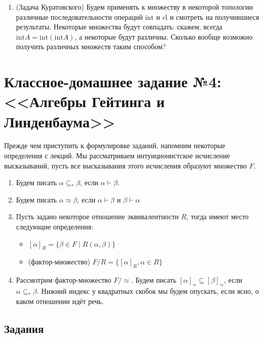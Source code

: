 \documentclass[10pt,a4paper,oneside]{article}
\begin{document}
\begin{enumerate}
\item (Задача Куратовского) Будем применять к множеству в некоторой топологии различные 
последовательности операций $\mathrm{int}$ и $\mathrm{cl}$ и смотреть на получившиеся
результаты. Некоторые множества будут
совпадать: скажем, всегда $\mathrm{int}A = \mathrm{int}(\mathrm{int}A)$, а некоторые будут
различны. Сколько вообще возможно получить различных множеств таким способом?

\end{enumerate}

\section*{Классное-домашнее задание №4: <<Алгебры Гейтинга и Линденбаума>>}

Прежде чем приступить к формулировке заданий, напомним некоторые определения с лекций.
Мы рассматриваем интуиционистское исчисление высказываний, пусть все высказывания этого 
исчисления образуют множество $F$.

\begin{enumerate}
\item Будем писать $\alpha\subseteq_*\beta$, если $\alpha\vdash\beta$.
\item Будем писать $\alpha\approx\beta$, если $\alpha\vdash\beta$ и $\beta\vdash\alpha$
\item Пусть задано некоторое отношение эквивалентности $R$, тогда имеют место следующие определения:
\begin{itemize}
\item $[\alpha]_R = \{\beta\in F \mid R(\alpha,\beta) \}$
\item (фактор-множество) $F/R = \{[\alpha]_R, \alpha \in R \}$
\end{itemize}
\item Рассмотрим фактор-множество $F/\approx$. Будем писать $[\alpha]_\approx\subseteq[\beta]_\approx$, 
если $\alpha\subseteq_*\beta$. Нижний индекс у квадратных скобок мы будем опускать, если ясно,
о каком отношении идёт речь.
\end{enumerate}

\subsection*{Задания}
\end{document}
